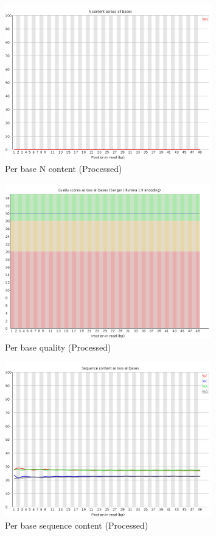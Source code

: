 \documentclass[UTF8]{ctexart}
\begin{document}
\begin{figure}[!htb]
	\centering
	\includegraphics[width=0.8\textwidth]{img/SRR14325859_FastQC_Processed_img/per_base_n_content.png}	%
	\caption{Per base N content (Processed)\protect}    %
\end{figure}

\clearpage

\begin{figure}[!htb]
	\centering
	\includegraphics[width=0.8\textwidth]{img/SRR14325859_FastQC_Processed_img/per_base_quality.png}	%
	\caption{Per base quality (Processed)\protect}    %
\end{figure}

\begin{figure}[!htb]
	\centering
	\includegraphics[width=0.8\textwidth]{img/SRR14325859_FastQC_Processed_img/per_base_sequence_content.png}	%
	\caption{Per base sequence content (Processed)\protect}    %
\end{figure}
\end{document}
